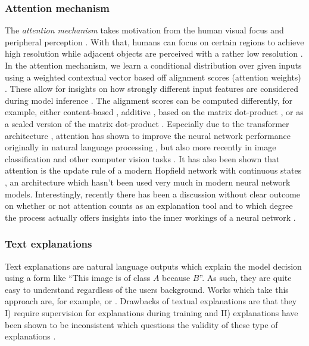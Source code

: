 \subsubsection{Attention mechanism}
The \emph{attention mechanism} \citep{VaswaniSPUJGKP17} takes motivation from the human visual focus and peripheral
perception \citep{schmidt2019recurrent}. With that, humans can focus on certain regions to achieve high resolution while adjacent objects are perceived with a rather low resolution \citep{schmidt2019recurrent}. In the attention mechanism, we learn a conditional distribution over given inputs using a weighted contextual vector based off alignment scores (attention weights) \citep{xie2020explainable}. These allow for insights on how strongly different input features are considered during model inference \citep{xie2020explainable}. The alignment scores can be computed differently, for example, either content-based \citep{graves2014neural}, additive \citep{BahdanauCB14}, based on the matrix dot-product \citep{LuongPM15}, or as a scaled version of the matrix dot-product \citep{VaswaniSPUJGKP17}. Especially due to the transformer architecture \citep{VaswaniSPUJGKP17}, attention has shown to improve the neural network performance originally in natural language processing \citep{DevlinCLT19, brown2020language, lan2019albert}, but also more recently in image classification and other computer vision tasks \citep{AnwarB19, ZamirAKHK0020}. It has also been shown that attention is the update rule of a modern Hopfield network with continuous states \citep{ramsauer2020hopfield}, an architecture which hasn't been used very much in modern neural network models. Interestingly, recently there has been a discussion without clear outcome on whether or not attention counts as an explanation tool and to which degree the process actually offers insights into the inner workings of a neural network \citep{JainW19, WiegreffeP19}.

\subsubsection{Text explanations}
Text explanations are natural language outputs which explain the model decision using a form like ``This image is of class $A$ because $B$''. As such, they are quite easy to understand regardless of the users background. Works which take this approach are, for example, \citet{HendricksARDSD16} or \citet{ParkHARSDR18}. Drawbacks of textual explanations are that they I) require supervision for explanations during training and II) explanations have been shown to be inconsistent which questions the validity of these type of explanations \citep{CamburuSMLB20}. 

